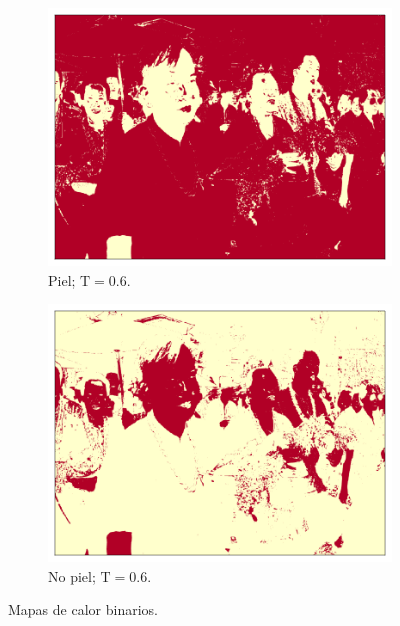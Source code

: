\begin{figure}[ht!]
\begin{subfigure}{0.4\textwidth}
    \end{subfigure}
    \begin{subfigure}{0.4\textwidth}
        \centering
        \includegraphics[width=\textwidth]{../figures/image1/image_01_treshskin_60percent.png}
        \caption{Piel; $\text{T} = 0.6$.}
        \label{fig:training_treshskin_6}
    \end{subfigure}
    \hspace{1cm}
    \begin{subfigure}{0.4\textwidth}
        \centering
        \includegraphics[width=\textwidth]{../figures/image1/image_01_treshbg_60percent.png}
        \caption{No piel; $\text{T} = 0.6$.}
        \label{fig:training_treshbg_6}
    \end{subfigure}
    \caption{Mapas de calor binarios.}
    \label{fig:binary_heatmaps_training}
\end{figure}


